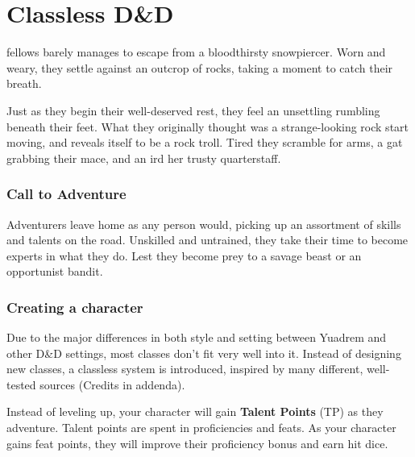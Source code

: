 \chapter{Classless D\&D}
fellows barely manages to escape from a bloodthirsty snowpiercer.
Worn and weary, they settle against an outcrop of rocks, taking a moment to catch their breath.

Just as they begin their well-deserved rest, they feel an unsettling rumbling beneath their feet.
What they originally thought was a strange-looking rock start moving, and reveals itself to be a rock troll.
Tired they scramble for arms, a gat grabbing their mace, and an ird her trusty quarterstaff.

\subsection*{Call to Adventure}
Adventurers leave home as any person would, picking up an assortment of skills and talents on the road.
Unskilled and untrained, they take their time to become experts in what they do.
Lest they become prey to a savage beast or an opportunist bandit.

\subsection*{Creating a character}
Due to the major differences in both style and setting between Yuadrem and other D\&D settings, most classes don't fit very well into it.
Instead of designing new classes, a classless system is introduced, inspired by many different, well-tested sources (Credits in addenda).

Instead of leveling up, your character will gain \textbf{Talent Points} (TP) as they adventure.
Talent points are spent in proficiencies and feats.
As your character gains feat points, they will improve their proficiency bonus and earn hit dice.

